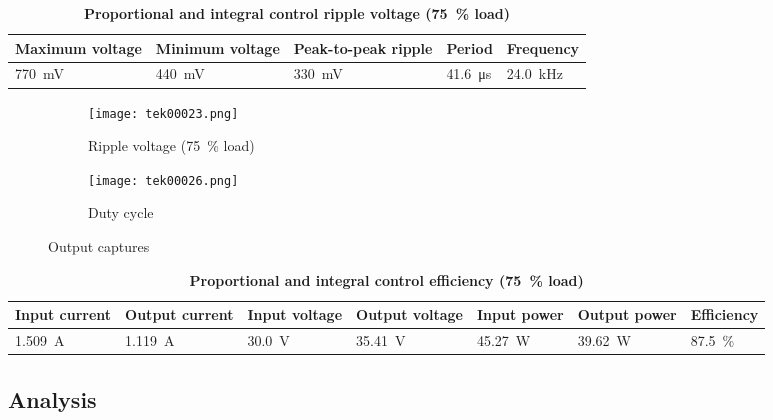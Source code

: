 \begin{table}[H]
    \centering
    \caption{\textbf{Proportional and integral control ripple voltage (\qty{75}{\percent} load)}}
    \begin{tabularx}{\columnwidth}{|X|X|X|X|X|}
        \hline
        Maximum voltage        & Minimum voltage        & Peak-to-peak ripple & Period          & Frequency        \\
        \hline
        \qty{770}{\milli\volt} & \qty{440}{\milli\volt} & \qty{330}{\mV}      & \qty{41.6}{\us} & \qty{24.0}{\kHz} \\
        \hline
    \end{tabularx}
\end{table}

\begin{figure}[H]
    \begin{subfigure}{0.5\textwidth}
        \texttt{[image: tek00023.png]}
        \caption{Ripple voltage (\qty{75}{\percent} load)}
    \end{subfigure}
    \hfill
    \begin{subfigure}{0.5\textwidth}
        \texttt{[image: tek00026.png]}
        \caption{Duty cycle}
    \end{subfigure}
    \caption{Output captures}
\end{figure}

\begin{table}[H]
    \centering
    \caption{\textbf{Proportional and integral control efficiency (\qty{75}{\percent} load)}}
    \begin{tabularx}{\columnwidth}{|X|X|X|X|X|X|X|}
        \hline
        Input current        & Output current       & Input voltage  & Output voltage  & Input power        & Output power       & Efficiency           \\
        \hline
        \qty{1.509}{\ampere} & \qty{1.119}{\ampere} & \qty{30.0}{\V} & \qty{35.41}{\V} & \qty{45.27}{\watt} & \qty{39.62}{\watt} & \qty{87.5}{\percent} \\
        \hline
    \end{tabularx}
\end{table}
\clearpage

\subsection{Analysis}
